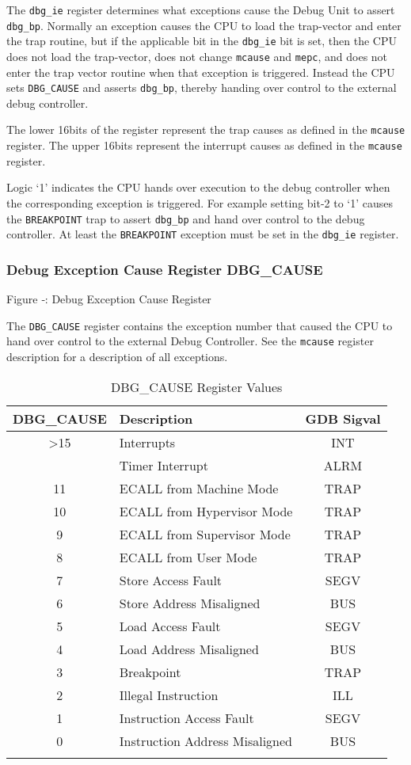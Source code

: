 The \texttt{dbg\_ie} register determines what exceptions cause the Debug Unit to
assert \texttt{dbg\_bp}. Normally an exception causes the CPU to load the
trap-vector and enter the trap routine, but if the applicable bit in the
\texttt{dbg\_ie} bit is set, then the CPU does not load the trap-vector, does not
change \texttt{mcause} and \texttt{mepc}, and does not enter the trap vector routine when
that exception is triggered. Instead the CPU sets \texttt{DBG\_CAUSE} and asserts
\texttt{dbg\_bp}, thereby handing over control to the external debug controller.

The lower 16bits of the register represent the trap causes as defined in
the \texttt{mcause} register. The upper 16bits represent the interrupt causes as
defined in the \texttt{mcause} register.

Logic `1' indicates the CPU hands over execution to the debug controller
when the corresponding exception is triggered. For example setting bit-2
to `1' causes the \texttt{BREAKPOINT} trap to assert \texttt{dbg\_bp} and hand over
control to the debug controller. At least the \texttt{BREAKPOINT} exception must
be set in the \texttt{dbg\_ie} register.

\subsubsection{Debug Exception Cause Register
DBG\_CAUSE}\label{debug-exception-cause-register-dbg_cause}

\missingfigure{}

Figure ‑: Debug Exception Cause Register

The \texttt{DBG\_CAUSE} register contains the exception number that caused the
CPU to hand over control to the external Debug Controller. See the
\texttt{mcause} register description for a description of all exceptions.

\begin{longtable}[]{@{}clc@{}}
\toprule
\textbf{DBG\_CAUSE} & \textbf{Description} & \textbf{GDB Sigval}\tabularnewline
\midrule
\endhead
\textgreater{}15 & Interrupts & INT\tabularnewline
& Timer Interrupt & ALRM\tabularnewline
11 & ECALL from Machine Mode & TRAP\tabularnewline
10 & ECALL from Hypervisor Mode & TRAP\tabularnewline
9 & ECALL from Supervisor Mode & TRAP\tabularnewline
8 & ECALL from User Mode & TRAP\tabularnewline
7 & Store Access Fault & SEGV\tabularnewline
6 & Store Address Misaligned & BUS\tabularnewline
5 & Load Access Fault & SEGV\tabularnewline
4 & Load Address Misaligned & BUS\tabularnewline
3 & Breakpoint & TRAP\tabularnewline
2 & Illegal Instruction & ILL\tabularnewline
1 & Instruction Access Fault & SEGV\tabularnewline
0 & Instruction Address Misaligned & BUS\tabularnewline
\bottomrule
\caption{DBG\_CAUSE Register Values}
\end{longtable}

